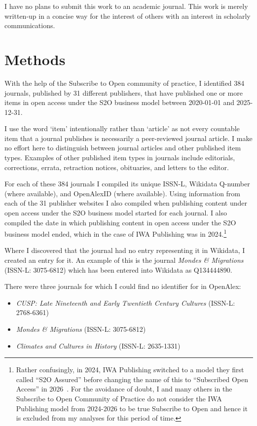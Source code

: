 \documentclass[10pt,a4paper]{article}
\begin{document}
I have no plans to submit this work to an academic journal. This work is merely written-up in a concise way for the interest of others with an interest in scholarly communications.

\section{Methods}

With the help of the Subscribe to Open community of practice, I identified 384 journals, published by 31 different publishers, that have published one or more items in open access under the S2O business model between 2020-01-01 and 2025-12-31.

I use the word `item' intentionally rather than `article' as not every countable item that a journal publishes is necessarily a peer-reviewed journal article. I make no effort here to distinguish between journal articles and other published item types. Examples of other published item types in journals include editorials, corrections, errata, retraction notices, obituaries, and letters to the editor.

For each of these 384 journals I compiled its unique ISSN\nobreakdash-L, Wikidata Q\nobreakdash-number (where available), and OpenAlexID (where available).
Using information from each of the 31 publisher websites I also compiled when publishing content under open access under the S2O business model started for each journal. I also compiled the date in which publishing content in open access under the S2O business model ended, which in the case of IWA Publishing was in 2024.\footnote{Rather confusingly, in 2024, IWA Publishing switched to a model they first called ``S2O Assured'' before changing the name of this to ``Subscribed Open Access'' in 2026~\citep{hejaziLygizou2026}. For the avoidance of doubt, I and many others in the Subscribe to Open Community of Practice do not consider the IWA Publishing model from 2024-2026 to be true Subscribe to Open and hence it is excluded from my analyses for this period of time.}

Where I discovered that the journal had no entry representing it in Wikidata, I created an entry for it. An example of this is the journal \textit{Mondes \& Migrations} (ISSN\nobreakdash-L: 3075-6812) which has been entered into Wikidata as Q134444890.

There were three journals for which I could find no identifier for in OpenAlex:

\begin{itemize}
    \item \textit{CUSP: Late Nineteenth and Early Twentieth Century Cultures} (ISSN\nobreakdash-L: 2768-6361)
    \item \textit{Mondes \& Migrations} (ISSN\nobreakdash-L: 3075-6812)
    \item \textit{Climates and Cultures in History} (ISSN\nobreakdash-L: 2635-1331)
\end{itemize}
\end{document}
